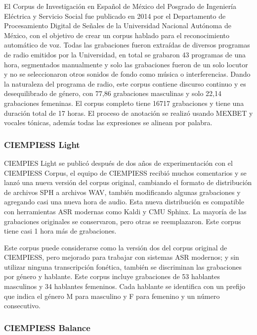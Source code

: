 \documentclass[a4paper,12pt,twoside]{report}
\begin{document}
El Corpus de Investigación en Español de México del Posgrado de Ingeniería Eléctrica y Servicio Social fue publicado en 2014 por el Departamento de Procesamiento Digital de Señales de la Universidad Nacional Autónoma de México, con el objetivo de crear un corpus hablado para el reconocimiento automático de voz. Todas las grabaciones fueron extraídas de diversos programas de radio emitidos por la Universidad, en total se grabaron 43 programas de una hora, segmentados manualmente y solo las grabaciones fueron de un solo locutor y no se seleccionaron otros sonidos de fondo como música o interferencias. Dando la naturaleza del programa de radio, este corpus contiene discurso continuo y es desequilibrado de género, con 77,86 grabaciones masculinas y solo 22,14 grabaciones femeninas. El corpus completo tiene 16717 grabaciones y tiene una duración total de 17 horas. El proceso de anotación se realizó usando MEXBET y vocales tónicas, además todas las expresiones se alinean por palabra.

\subsubsection{CIEMPIESS Light}

CIEMPIES Light se publicó después de dos años de experimentación con el CIEMPIESS Corpus, el equipo de CIEMPIESS recibió muchos comentarios y se lanzó una nueva versión del corpus original, cambiando el formato de distribución de archivos SPH a archivos WAV, también modificando algunas grabaciones y agregando casi una nueva hora de audio. Esta nueva distribución es compatible con herramientas ASR modernas como Kaldi y CMU Sphinx. La mayoría de las grabaciones originales se conservaron, pero otras se reemplazaron. Este corpus tiene casi 1 hora más de grabaciones.

Este corpus puede considerarse como la versión dos del corpus original de CIEMPIESS, pero mejorado para trabajar con sistemas ASR modernos; y sin utilizar ninguna transcripción fonética, también se discriminan las grabaciones por género y hablante. Este corpus incluye grabaciones de 53 hablantes masculinos y 34 hablantes femeninos. Cada hablante se identifica con un prefijo que indica el género M para masculino y F para femenino y un número consecutivo.

\subsubsection{CIEMPIESS Balance}
\end{document}
